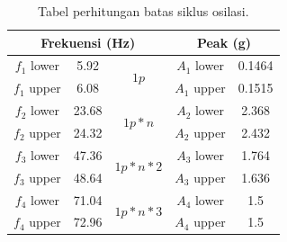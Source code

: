 \begin{table}[H]
	\caption{Tabel perhitungan batas siklus osilasi.}
	\label{tb:batas_siklus}
	\centering
	\begin{tabular}{|ccc|cc|}
		\hline
		\multicolumn{3}{|c|}{Frekuensi (Hz)}                                                       & \multicolumn{2}{c|}{Peak (g)}             \\ \hline
		\multicolumn{1}{|c|}{$f_1$ lower} & \multicolumn{1}{c|}{5.92}  & \multirow{2}{*}{$1p$}       & \multicolumn{1}{c|}{$A_1$ lower} & 0.1464 \\ \cline{1-2} \cline{4-5} 
		\multicolumn{1}{|c|}{$f_1$ upper} & \multicolumn{1}{c|}{6.08}  &                           & \multicolumn{1}{c|}{$A_1$ upper} & 0.1515 \\ \hline
		\multicolumn{1}{|c|}{$f_2$ lower} & \multicolumn{1}{c|}{23.68} & \multirow{2}{*}{$1p*n$}   & \multicolumn{1}{c|}{$A_2$ lower} & 2.368  \\ \cline{1-2} \cline{4-5} 
		\multicolumn{1}{|c|}{$f_2$ upper} & \multicolumn{1}{c|}{24.32} &                           & \multicolumn{1}{c|}{$A_2$ upper} & 2.432  \\ \hline
		\multicolumn{1}{|c|}{$f_3$ lower} & \multicolumn{1}{c|}{47.36} & \multirow{2}{*}{$1p*n*2$} & \multicolumn{1}{c|}{$A_3$ lower} & 1.764 \\ \cline{1-2} \cline{4-5} 
		\multicolumn{1}{|c|}{$f_3$ upper} & \multicolumn{1}{c|}{48.64} &                           & \multicolumn{1}{c|}{$A_3$ upper} & 1.636  \\ \hline
		\multicolumn{1}{|c|}{$f_4$ lower} & \multicolumn{1}{c|}{71.04} & \multirow{2}{*}{$1p*n*3$} & \multicolumn{1}{c|}{$A_4$ lower} & 1.5    \\ \cline{1-2} \cline{4-5} 
		\multicolumn{1}{|c|}{$f_4$ upper} & \multicolumn{1}{c|}{72.96} &                           & \multicolumn{1}{c|}{$A_4$ upper} & 1.5    \\ \hline
	\end{tabular}
\end{table}

